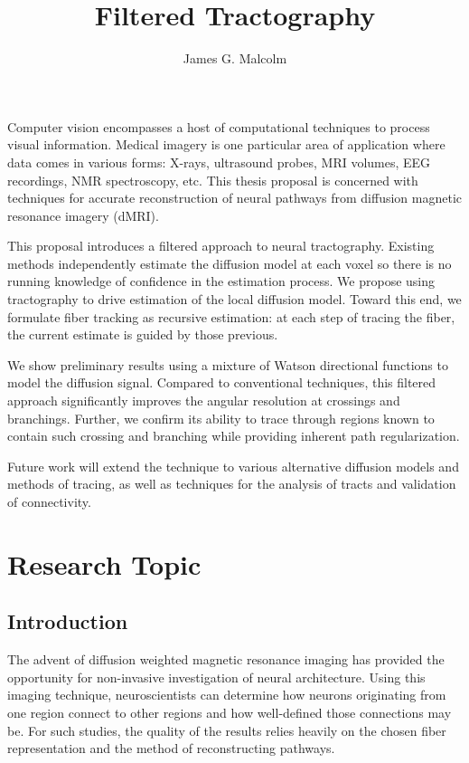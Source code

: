 \documentclass[letterpaper,hyperref,12pt]{gatech-thesis}
\title{Filtered Tractography}
\author{James G. Malcolm}
\begin{document}

\begin{preliminary}
\contents


\begin{summary}
  Computer vision encompasses a host of computational techniques to process
  visual information.
  Medical imagery is one particular area of application where data comes in
  various forms: X-rays, ultrasound probes, MRI volumes, EEG recordings, NMR
  spectroscopy, etc.
  This thesis proposal is concerned with techniques for accurate
  reconstruction of neural pathways from diffusion magnetic resonance imagery
  (dMRI).

  This proposal introduces a filtered approach to neural tractography.
  Existing methods independently estimate the diffusion model at each voxel so
  there is no running knowledge of confidence in the estimation process.
  We propose using tractography to drive estimation of the local diffusion
  model.
  Toward this end, we formulate fiber tracking as recursive estimation: at
  each step of tracing the fiber, the current estimate is guided by those
  previous.

  We show preliminary results using a mixture of Watson directional functions
  to model the diffusion signal.  Compared to conventional techniques, this
  filtered approach significantly improves the angular resolution at crossings
  and branchings.  Further, we confirm its ability to trace through regions
  known to contain such crossing and branching while providing inherent path
  regularization.

  Future work will extend the technique to various alternative diffusion
  models and methods of tracing, as well as techniques for the analysis of
  tracts and validation of connectivity.
\end{summary}

\end{preliminary}

\chapter{Research Topic}

\section{Introduction}
The advent of diffusion weighted magnetic resonance imaging has provided the
opportunity for non-invasive investigation of neural architecture.  Using this
imaging technique, neuroscientists can determine how neurons originating from
one region connect to other regions and how well-defined those connections may
be.  For such studies, the quality of the results relies heavily on the chosen
fiber representation and the method of reconstructing pathways.
\end{document}

